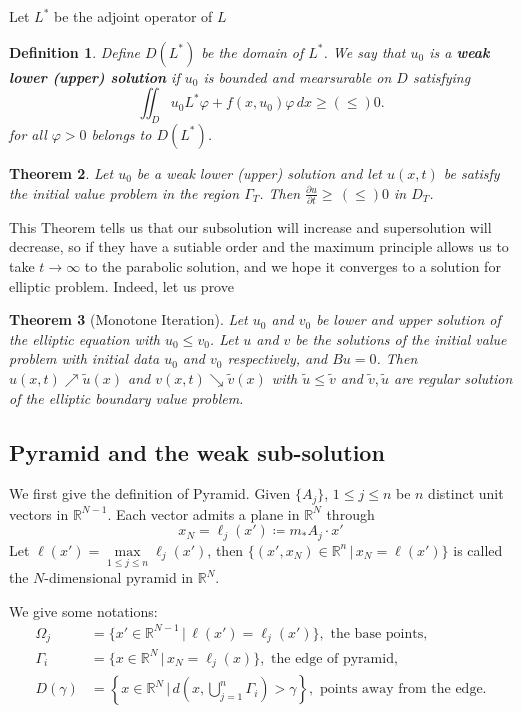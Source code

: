 \documentclass[12pt, a4paper]{article}
\newtheorem{thm}{Theorem}[section]
\newtheorem{defn}[thm]{Definition}
\numberwithin{equation}{section}
\newcommand{\R}{\mathbb{R}}
\newcommand{\named}[1]{\textnormal{\textbf{#1}}}
\newcommand{\pd}[2]{\frac{\partial #1}{\partial #2}}
\begin{document}
\begin{CJK}{UTF8}{bkai}
	Let $L^*$ be the adjoint operator of $L$
\begin{defn}
	Define $D(L^*)$ be the domain of $L^*$. We say that $u_0$ is a \named{weak lower (upper) solution} if $u_0$ is bounded and mearsurable on $D$ satisfying
\begin{equation}
	\iint_{D}u_0L^*\varphi+f(x,u_0)\varphi\,dx\geq(\leq) 0.
\end{equation}
for all $\varphi>0$ belongs to $D(L^*)$. 
\end{defn}

\begin{thm}\cite[Theorem 3.4]{Sa1972}
	Let $u_0$ be a weak lower (upper) solution and let $u(x,t)$ be satisfy the initial value problem in the region $\Gamma_T$. Then $\pd{u}{t}\geq\,(\leq)0$ in $D_T$.
\end{thm}
 
This Theorem tells us that our subsolution will increase and supersolution will decrease, so if they have a sutiable order and the maximum principle allows us to take $t\to\infty$ to the parabolic solution, and we hope it converges to a solution for elliptic problem. Indeed, let us prove 

\begin{thm}[Monotone Iteration]\cite[Theorem3.6]{Sa1972}\label{thm2.4}
	Let $u_0$ and $v_0$ be lower and upper solution of the elliptic equation with $u_0\leq v_0$. Let $u$ and $v$ be the solutions of the initial value problem with initial data $u_0$ and $v_0$ respectively, and $Bu=0$. Then $u(x,t)\nearrow \tilde{u}(x)$ and $v(x,t)\searrow \tilde{v}(x)$ with $\tilde{u}\leq\tilde{v}$ and $\tilde{v},\tilde{u}$ are regular solution of the elliptic boundary value problem.
\end{thm}




\subsection{Pyramid and the weak sub-solution}

	We first give the definition of Pyramid. Given $\{A_j\}$, $1\leq j\leq n$ be $n$ distinct unit vectors in $\R^{N-1}$. Each vector admits a plane in $\R^N$ through
\[
	x_N=\ell_j(x')\coloneqq m_*A_j\cdot x'
\]
Let $\ell(x')=\max\limits_{1\leq j\leq n}\ell_j(x')$, then $\{(x',x_N)\in\R^n\,|\, x_N=\ell(x')\}$ is called the $N$-dimensional pyramid in $\R^N$.

We give some notations:
\begin{align}
	\Omega_j&=\{x'\in\R^{N-1}\,|\,\ell(x')=\ell_j(x')\},\mbox{ the base points,}\\
	\Gamma_i&=\{x\in\R^N\,|\,x_N=\ell_j(x)\},\mbox{ the edge of pyramid,}\\
	D(\gamma)&=\left\{x\in\R^N\,|\,d\left(x,\bigcup_{j=1}^n\Gamma_i\right)>\gamma\right\},\mbox{ points away from the edge.}\label{iden2.13}
\end{align}



\end{CJK}
\end{document}

